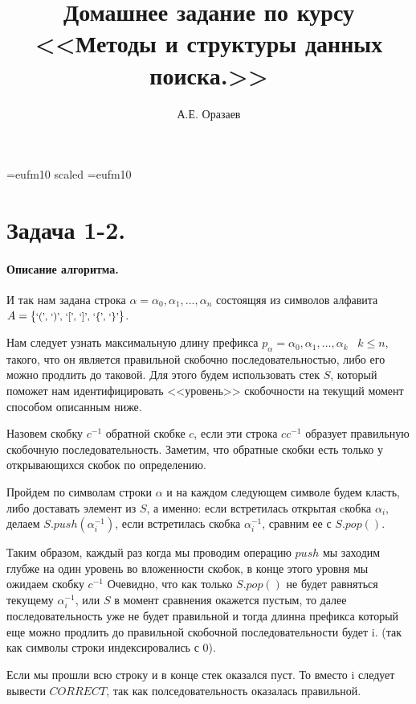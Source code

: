 \documentclass[12pt]{article}
\title{\bf Домашнее задание по курсу \\ <<Методы
и структуры данных поиска.>>}
\author{А.Е. Оразаев}
\date{}
\begin{document}
\voffset=-20mm 
\hoffset=-12mm
\font\Got=eufm10 scaled \font\Got=eufm10

\maketitle

\section{Задача 1-2.} 

\paragraph{Описание алгоритма.}И так нам задана строка $ \alpha = \alpha_0, \alpha_1, ..., \alpha_n$ состоящяя
из символов алфавита 
$ A = \left\{ 
    \mbox{\footnotesize{`(', `)', `[', `]', `\{', `\}'}}
\right\} $.

Нам следует узнать максимальную длину префикса $ p_{\alpha} = \alpha_0, \alpha_1, ..., \alpha_k \;\;\; k \le n$, такого, что он является
правильной скобочно последовательностью, либо его можно продлить до таковой. Для этого будем использовать стек $ S $,
который поможет нам идентифицировать <<уровень>> скобочности на текущий момент способом
описанным ниже.

Назовем скобку $ c^{-1} $ обратной скобке $ c $, если эти строка $ cc^{-1} $ образует правильную скобочную последовательность.
Заметим, что обратные скобки есть только у открывающихся скобок по определению.

Пройдем по символам строки $ \alpha $ и на каждом следующем символе будем класть, либо доставать элемент из $ S $, а именно:
если встретилась открытая cкобка $ \alpha_i $, делаем $ S.push(\alpha_i^{-1}) $, если встретилась скобка $\alpha_i^{-1}$, сравним ее 
с $ S.pop() $.

Таким образом, каждый раз когда мы проводим операцию $ push $ мы заходим глубже на один уровень во вложенности скобок, в
конце этого уровня мы ожидаем скобку $ c^{-1} $
Очевидно, что как только $ S.pop() $ не будет равняться текущему $ \alpha_i^{-1} $, или $ S $ в момент сравнения окажется пустым, 
то далее последовательность уже не будет правильной и тогда длинна префикса который еще можно продлить до правильной скобочной 
последовательности будет i. (так как символы строки индексировались с 0).

Если мы прошли всю строку и в конце стек оказался пуст. То вместо i следует вывести $ CORRECT $, так как полседовательность оказалась правильной.
\end{document}
